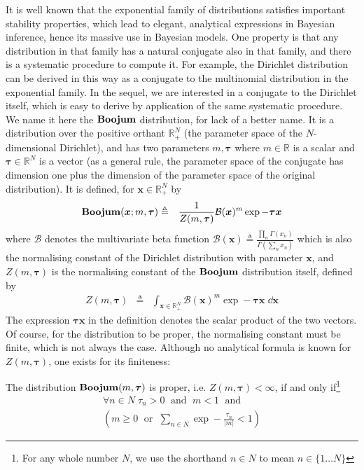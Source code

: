 It is well known that the exponential family of distributions satisfies important stability properties, which lead to elegant, analytical expressions in Bayesian inference, hence its massive use in Bayesian models. One property is that any distribution in that family has a natural conjugate also in that family, and there is a systematic procedure to compute it. For example, the Dirichlet distribution can be derived in this way as a conjugate to the multinomial distribution in the exponential family. In the sequel, we are interested in a conjugate to the Dirichlet itself, which is easy to derive by application of the same systematic procedure. We name it here the $\mathbf{Boojum}$ distribution, for lack of a better name. It is a distribution over the positive orthant $\mathbb{R}_+^N$ (the parameter space of the $N$-dimensional Dirichlet), and has two parameters $m,\boldsymbol{\tau}$ where $m\in\mathbb{R}$ is a scalar and $\boldsymbol{\tau}\in\mathbb{R}^N$ is a vector (as a general rule, the parameter space of the conjugate has dimension one plus the dimension of the parameter space of the original distribution). It is defined, for $\boldsymbol{x}\in\mathbb{R}_+^N$ by
\begin{eqnarray*}
\mathbf{Boojum}(\boldsymbol{x};m,\boldsymbol{\tau}) & \triangleq & \frac{1}{Z(m,\boldsymbol{\tau})}\mathcal{B}(\boldsymbol{x})^m\exp-\boldsymbol{\tau}\boldsymbol{x}
\end{eqnarray*}
where $\mathcal{B}$ denotes the multivariate beta function $\mathcal{B}(\boldsymbol{x})\triangleq\frac{\prod_n\Gamma(x_n)}{\Gamma(\sum_nx_n)}$ which is also the normalising constant of the Dirichlet distribution with parameter $\boldsymbol{x}$, and $Z(m,\boldsymbol{\tau})$ is the normalising constant of the $\mathbf{Boojum}$ distribution itself, defined by
\begin{eqnarray*}
Z(m,\boldsymbol{\tau}) & \triangleq & \int_{\boldsymbol{x}\in\mathbb{R}_+^N}\mathcal{B}(\boldsymbol{x})^m\exp-\boldsymbol{\tau} \boldsymbol{x}\;\dd{\boldsymbol{x}}
\end{eqnarray*}
The expression $\boldsymbol{\tau} \boldsymbol{x}$ in the definition denotes the scalar product of the two vectors. Of course, for the distribution to be proper, the normalising constant must be finite, which is not always the case. Although no analytical formula is known for $Z(m,\boldsymbol{\tau})$, one exists for its finiteness:
\begin{proposition}
\label{prop:mbeta-proper}
The distribution $\mathbf{Boojum}(m,\boldsymbol{\tau})$ is proper, i.e. $Z(m,\boldsymbol{\tau})<\infty$, if and only if\footnote{For any whole number $N$, we use the shorthand $n\in N$ to mean $n\in\{1\ldots N\}$}
\[
\begin{array}{l}
\forall n\in N\;\tau_n>0 \;\textrm{ and }\; m<1 \;\textrm{ and }\\
(m\geq0 \;\textrm{ or }\; \sum_{n\in N}\exp-\frac{\tau_n}{|m|}<1)
\end{array}
\]
\end{proposition}
